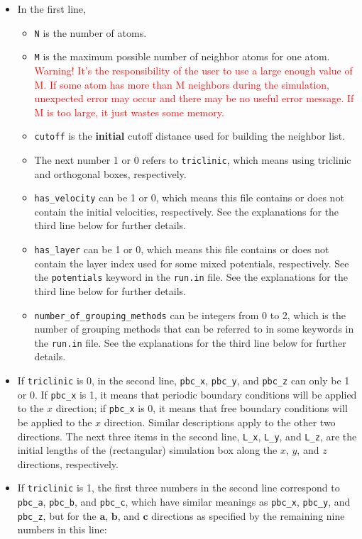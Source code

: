 \documentclass[12pt,a4paper]{report}
\newcommand{\vect}[1]{\boldsymbol{#1}}
\begin{document}
\begin{itemize}
\item In the first line, 
\begin{itemize}
\item \verb"N" is the number of atoms.
\item \verb"M" is the maximum possible number of neighbor atoms for one atom. \textcolor{red}{Warning! It's the responsibility of the user to use a large enough value of M. If some atom has more than M neighbors during the simulation, unexpected error may occur and there may be no useful error message. If M is too large, it just wastes some memory. } 
\item \verb"cutoff" is the \textbf{initial} cutoff distance used for building the neighbor list. 
\item The next number 1 or 0 refers to \verb"triclinic", which means using triclinic and orthogonal boxes, respectively.
\item \verb"has_velocity" can be 1 or 0, which means this file contains or does not contain the initial velocities, respectively.  See the explanations for the third line below for further details.
\item \verb"has_layer" can be 1 or 0, which means this file contains or does not contain the layer index used for some mixed potentials, respectively. See the \verb"potentials" keyword in the \verb"run.in" file.  See the explanations for the third line below for further details.
\item \verb"number_of_grouping_methods" can be integers from 0 to 2, which is the number of grouping methods that can be referred to in some keywords in the \verb"run.in" file.  See the explanations for the third line below for further details.
\end{itemize}
\item If \verb"triclinic" is 0, in the second line, \verb"pbc_x",  \verb"pbc_y", and \verb"pbc_z" can only be 1 or 0. If \verb"pbc_x" is 1, it means that periodic boundary conditions will be applied to the $x$ direction; if \verb"pbc_x" is 0, it means that free boundary conditions will be applied to the $x$ direction. Similar descriptions apply to the other two directions. The next three items in the second line, \verb"L_x", \verb"L_y", and \verb"L_z", are the initial lengths of the (rectangular) simulation box along the $x$, $y$, and $z$ directions, respectively.
\item If \verb"triclinic" is 1, the first three numbers in the second line correspond to \verb"pbc_a",  \verb"pbc_b", and \verb"pbc_c", which have similar meanings as \verb"pbc_x",  \verb"pbc_y", and \verb"pbc_z", but for the $\vect{a}$, $\vect{b}$, and $\vect{c}$ directions as specified by the remaining nine numbers in this line:

\end{itemize}
\end{document}

